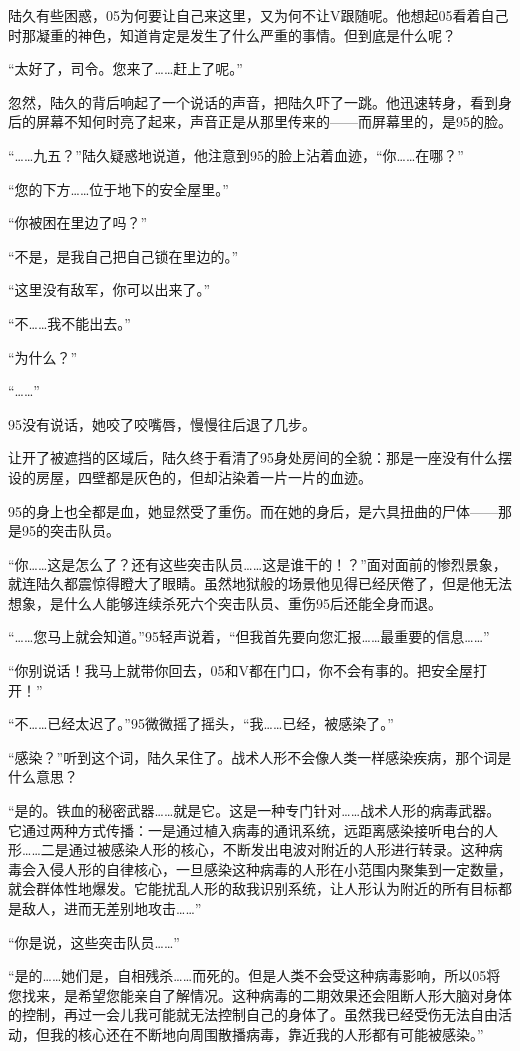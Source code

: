陆久有些困惑，05为何要让自己来这里，又为何不让V跟随呢。他想起05看着自己时那凝重的神色，知道肯定是发生了什么严重的事情。但到底是什么呢？

“太好了，司令。您来了……赶上了呢。”

忽然，陆久的背后响起了一个说话的声音，把陆久吓了一跳。他迅速转身，看到身后的屏幕不知何时亮了起来，声音正是从那里传来的——而屏幕里的，是95的脸。

“……九五？”陆久疑惑地说道，他注意到95的脸上沾着血迹，“你……在哪？”

“您的下方……位于地下的安全屋里。”

“你被困在里边了吗？”

“不是，是我自己把自己锁在里边的。”

“这里没有敌军，你可以出来了。”

“不……我不能出去。”

“为什么？”

“……”

95没有说话，她咬了咬嘴唇，慢慢往后退了几步。

让开了被遮挡的区域后，陆久终于看清了95身处房间的全貌：那是一座没有什么摆设的房屋，四壁都是灰色的，但却沾染着一片一片的血迹。

95的身上也全都是血，她显然受了重伤。而在她的身后，是六具扭曲的尸体——那是95的突击队员。

“你……这是怎么了？还有这些突击队员……这是谁干的！？”面对面前的惨烈景象，就连陆久都震惊得瞪大了眼睛。虽然地狱般的场景他见得已经厌倦了，但是他无法想象，是什么人能够连续杀死六个突击队员、重伤95后还能全身而退。

“……您马上就会知道。”95轻声说着，“但我首先要向您汇报……最重要的信息……”

“你别说话！我马上就带你回去，05和V都在门口，你不会有事的。把安全屋打开！”

“不……已经太迟了。”95微微摇了摇头，“我……已经，被感染了。”

“感染？”听到这个词，陆久呆住了。战术人形不会像人类一样感染疾病，那个词是什么意思？

“是的。铁血的秘密武器……就是它。这是一种专门针对……战术人形的病毒武器。它通过两种方式传播：一是通过植入病毒的通讯系统，远距离感染接听电台的人形……二是通过被感染人形的核心，不断发出电波对附近的人形进行转录。这种病毒会入侵人形的自律核心，一旦感染这种病毒的人形在小范围内聚集到一定数量，就会群体性地爆发。它能扰乱人形的敌我识别系统，让人形认为附近的所有目标都是敌人，进而无差别地攻击……”

“你是说，这些突击队员……”

“是的……她们是，自相残杀……而死的。但是人类不会受这种病毒影响，所以05将您找来，是希望您能亲自了解情况。这种病毒的二期效果还会阻断人形大脑对身体的控制，再过一会儿我可能就无法控制自己的身体了。虽然我已经受伤无法自由活动，但我的核心还在不断地向周围散播病毒，靠近我的人形都有可能被感染。”


